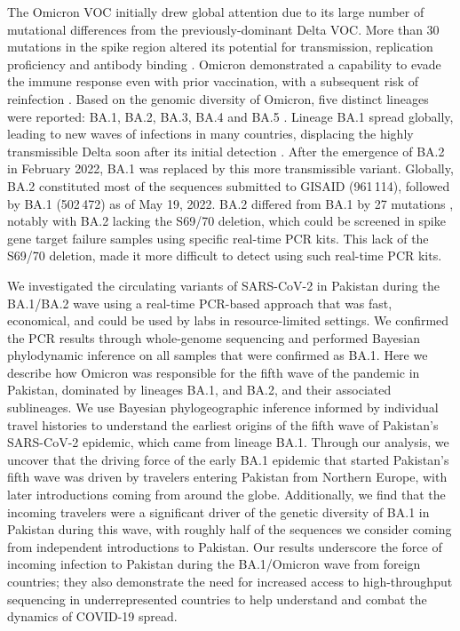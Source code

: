 The Omicron VOC initially drew global attention due to its large number of mutational differences from the previously-dominant Delta VOC.
More than 30 mutations in the spike region altered its potential for transmission, replication proficiency and antibody binding \citep{viana2022rapid}.
Omicron demonstrated a capability to evade the immune response even with prior vaccination, with a subsequent risk of reinfection \citep{cele2022Omicron, lista2022p681h}.
Based on the genomic diversity of Omicron, five distinct lineages were reported: BA.1, BA.2, BA.3, BA.4 and BA.5 \citep{rambaut2020dynamic,o2022pango}.
Lineage BA.1 spread globally, leading to new waves of infections in many countries, displacing the highly transmissible Delta soon after its initial detection \citep{yamasoba2022virological}.
After the emergence of BA.2 in February 2022, BA.1 was replaced by this more transmissible variant.
Globally, BA.2 constituted most of the sequences submitted to GISAID (961\,114), followed by BA.1 (502\,472) as of May 19, 2022.
BA.2 differed from BA.1 by 27 mutations \citep{wolter2022early}, notably with BA.2 lacking the S69/70 deletion, which could be screened in spike gene target failure samples using specific real-time PCR kits.
This lack of the S69/70 deletion, made it more difficult to detect using such real-time PCR kits.

We investigated the circulating variants of SARS-CoV-2 in Pakistan during the BA.1/BA.2 wave using a real-time PCR-based approach that was fast, economical, and could be used by labs in resource-limited settings.
We confirmed the PCR results through whole-genome sequencing and performed Bayesian phylodynamic inference on all samples that were confirmed as BA.1.
Here we describe how Omicron was responsible for the fifth wave of the pandemic in Pakistan, dominated by lineages BA.1, and BA.2, and their associated sublineages.
We use Bayesian phylogeographic inference informed by individual travel histories to understand the earliest origins of the fifth wave of Pakistan's SARS-CoV-2 epidemic, which came from lineage BA.1.
Through our analysis, we uncover that the driving force of the early BA.1 epidemic that started Pakistan's fifth wave was driven by travelers entering Pakistan from Northern Europe, with later introductions coming from around the globe.
Additionally, we find that the incoming travelers were a significant driver of the genetic diversity of BA.1 in Pakistan during this wave, with roughly half of the sequences we consider coming from independent introductions to Pakistan.
Our results underscore the force of incoming infection to Pakistan during the BA.1/Omicron wave from foreign countries; they also demonstrate the need for increased access to high-throughput sequencing in underrepresented countries to help understand and combat the dynamics of COVID-19 spread.


